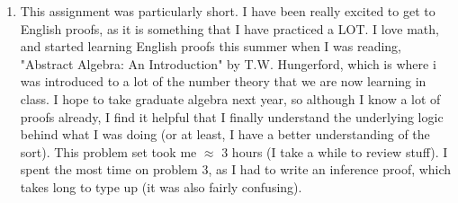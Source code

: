 \documentclass[12pt]{article}
\theoremstyle{definition}
\theoremstyle{remark}
\begin{document}
\begin{enumerate}[leftmargin=\labelsep]
		\newpage
		\item This assignment was particularly short. I have been really excited to get to English proofs, as it is something that I have practiced a LOT. I love math, and started learning English proofs this summer when I was reading, "Abstract Algebra: An Introduction" by T.W. Hungerford, which is where i was introduced to a lot of the number theory that we are now learning in class. I hope to take graduate algebra next year, so although I know a lot of proofs already, I find it helpful that I finally understand the underlying logic behind what I was doing (or at least, I have a better understanding of the sort). This problem set took me $\approx$ 3 hours (I take a while to review stuff). I spent the most time on problem 3, as I had to write an inference proof, which takes long to type up (it was also fairly confusing).
	\end{enumerate}
\end{document}
